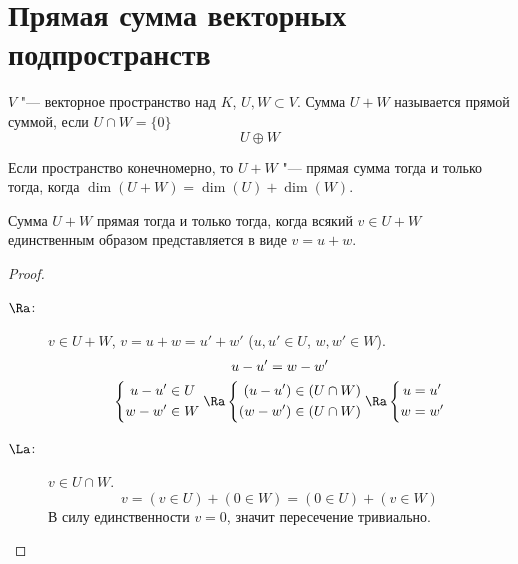 ﻿\section{Прямая сумма векторных подпространств}

\begin{Def}
	$V$ "--- векторное пространство над $K$, $U, W \subset V$.
	Сумма $U+W$ называется прямой суммой, если $U \cap W = \{0\}$
	\[ U \oplus W \]
\end{Def}

\begin{theorem}
	Если пространство конечномерно, то $U + W$ "--- прямая сумма тогда и только тогда, когда $\dim(U + W) = \dim(U) + \dim(W)$.

	Сумма $U + W$ прямая тогда и только тогда, когда всякий $v \in U + W$ единственным образом представляется в виде $v = u + w$.
\end{theorem}

\begin{proof}
	\begin{description}
	\item[$\Ra$:]
		$v \in U + W$, $v = u + w = u' + w'$ ($u, u' \in U$, $w, w' \in W$).
		\begin{gather*}
			u - u' = w - w'\\
			\left\{\begin{aligned}
				u - u' &\in U \\
				w - w' &\in W
			\end{aligned}\right. \Ra \left\{\begin{aligned}
				(u - u') &\in (U \cap W) \\
				(w - w') &\in (U \cap W)
			\end{aligned}\right. \Ra \left\{\begin{aligned}
				u &= u' \\
				w &= w'
			\end{aligned}\right.
		\end{gather*}

	\item[$\La$:]
		$v \in U \cap W$.
		\[ v = (v \in U) + (0 \in W) = (0 \in U) + (v \in W) \]
		В силу единственности $v = 0$, значит пересечение тривиально.
	\end{description}
\end{proof}
